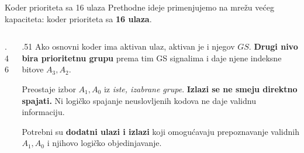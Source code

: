 \begin{frame}[t,label=03-s019]{Koder prioriteta sa 16 ulaza}
\setlength{\parskip}{0pt}
Prethodne ideje primenjujemo na mrežu većeg kapaciteta: koder prioriteta sa \textbf{16 ulaza}.
\par\vspace{1mm}
\begin{columns}[T,onlytextwidth]
\begin{column}{.46\textwidth}\centering

\end{column}
\begin{column}{.51\textwidth}
Ako osnovni koder ima aktivan ulaz, aktivan je i njegov \(GS\).
\textbf{Drugi nivo bira prioritetnu grupu} prema tim GS signalima
i daje njene indeksne bitove \(A_3,A_2\).
\par\vspace{2mm}
Preostaje izbor \(A_1,A_0\) iz \emph{iste, izabrane grupe}.
\textcolor{DEisticanje}{\textbf{Izlazi se ne smeju direktno spajati.}}
Ni logičko spajanje neuslovljenih kodova ne daje validnu informaciju.
\par\vspace{2mm}
Potrebni su \textbf{dodatni ulazi i izlazi} koji omogućavaju prepoznavanje
validnih \(A_1,A_0\) i njihovo logičko objedinjavanje.
\end{column}
\end{columns}
\end{frame}
